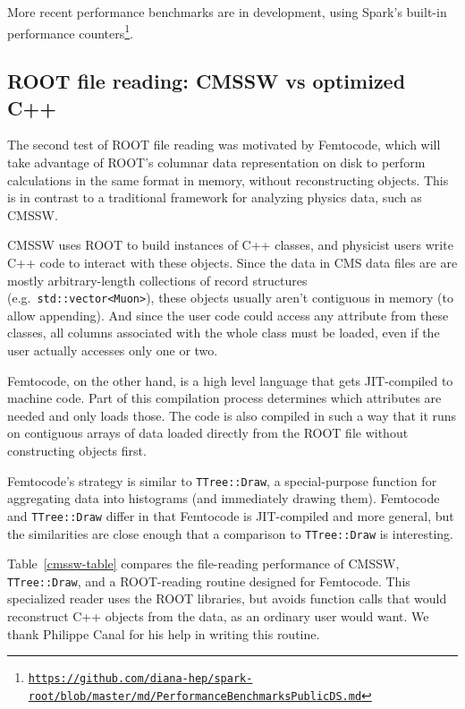 \documentclass[12pt]{article}
\begin{document}
More recent performance benchmarks are in development, using Spark's built-in performance counters\footnote{\href{https://github.com/diana-hep/spark-root/blob/master/md/PerformanceBenchmarksPublicDS.md}{\tt https://github.com/diana-hep/spark-root/blob/master/md/PerformanceBenchmarksPublicDS.md}}.

\subsection*{ROOT file reading: CMSSW vs optimized C++}

The second test of ROOT file reading was motivated by Femtocode, which will take advantage of ROOT's columnar data representation on disk to perform calculations in the same format in memory, without reconstructing objects. This is in contrast to a traditional framework for analyzing physics data, such as CMSSW.

CMSSW uses ROOT to build instances of C++ classes, and physicist users write C++ code to interact with these objects. Since the data in CMS data files are are mostly arbitrary-length collections of record structures (e.g.\ {\tt std::vector<Muon>}), these objects usually aren't contiguous in memory (to allow appending). And since the user code could access any attribute from these classes, all columns associated with the whole class must be loaded, even if the user actually accesses only one or two.

Femtocode, on the other hand, is a high level language that gets JIT-compiled to machine code. Part of this compilation process determines which attributes are needed and only loads those. The code is also compiled in such a way that it runs on contiguous arrays of data loaded directly from the ROOT file without constructing objects first.

Femtocode's strategy is similar to {\tt TTree::Draw}, a special-purpose function for aggregating data into histograms (and immediately drawing them). Femtocode and {\tt TTree::Draw} differ in that Femtocode is JIT-compiled and more general, but the similarities are close enough that a comparison to {\tt TTree::Draw} is interesting.

Table~\ref{cmssw-table} compares the file-reading performance of CMSSW, {\tt TTree::Draw}, and a ROOT-reading routine designed for Femtocode. This specialized reader uses the ROOT libraries, but avoids function calls that would reconstruct C++ objects from the data, as an ordinary user would want. We thank Philippe Canal for his help in writing this routine.
\end{document}
